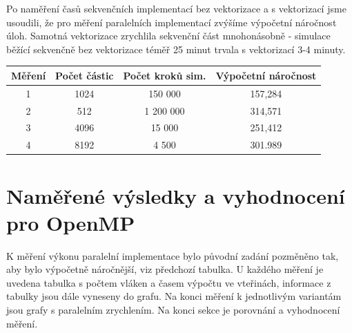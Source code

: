 \documentclass[12pt]{article}
\begin{document}
Po naměření časů sekvenčních implementací bez vektorizace a s vektorizací jsme usoudili, že pro měření paralelních implementací zvýšíme výpočetní náročnost úloh.
Samotná vektorizace zrychlila sekvenční část mnohonásobně - simulace běžící sekvenčně bez vektorizace téměř 25 minut trvala s vektorizací 3-4 minuty.

\begin{center}
\begin{tabular}{c | c | c | c}
\textbf{Měření} & \textbf{Počet částic} & \textbf{Počet kroků sim.} & \textbf{Výpočetní náročnost} \\ \hline \hline
1 & 1024 & 150 000 & 157,284 \\ \hline
2 & 512 & 1 200 000 & 314,571 \\ \hline
3 & 4096 & 15 000 & 251,412 \\ \hline
4 & 8192 & 4 500 & 301.989 \\ \hline
\end{tabular}
\end{center}

\section{Naměřené výsledky a vyhod\-noce\-ní pro O\-pen\-MP}
K měření výkonu paralelní implementace bylo původní zadání pozměněno tak, aby bylo výpočetně náročnější, viz předchozí tabulka.
U každého měření je uvedena tabulka s počtem vláken a časem výpočtu ve vteřinách, informace z tabulky jsou dále vyneseny do grafu.
Na konci měření k jednotlivým variantám jsou grafy s paralelním zrychlením.
Na konci sekce je porovnání a vyhodnocení měření.
\end{document}
